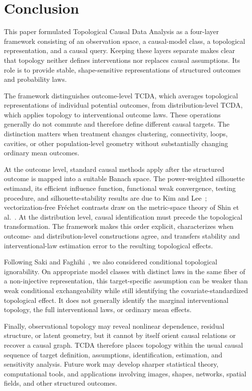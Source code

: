 \documentclass[11pt,a4paper]{article}
\theoremstyle{plain}
\theoremstyle{definition}
\theoremstyle{remark}
\newcommand{\1}{\mathbbm{1}}
\begin{document}

\section{Conclusion}
\label{sec:conclusion}

This paper formulated Topological Causal Data Analysis as a four-layer framework consisting of an observation space, a causal-model class, a topological representation, and a causal query. Keeping these layers separate makes clear that topology neither defines interventions nor replaces causal assumptions. Its role is to provide stable, shape-sensitive representations of structured outcomes and probability laws.

The framework distinguishes outcome-level TCDA, which averages topological representations of individual potential outcomes, from distribution-level TCDA, which applies topology to interventional outcome laws. These operations generally do not commute and therefore define different causal targets. The distinction matters when treatment changes clustering, connectivity, loops, cavities, or other population-level geometry without substantially changing ordinary mean outcomes.

At the outcome level, standard causal methods apply after the structured outcome is mapped into a suitable Banach space. The power-weighted silhouette estimand, its efficient influence function, functional weak convergence, testing procedure, and silhouette-stability results are due to Kim and Lee~\citep{kimlee2026}; vectorization-free Fr\'echet contrasts draw on the metric-space theory of Shin et al.~\citep{shinetal2024}. At the distribution level, causal identification must precede the topological transformation. The framework makes this order explicit, characterizes when outcome- and distribution-level constructions agree, and transfers stability and interventional-law estimation error to the resulting topological effects.

Following Saki and Faghihi~\citep{sakifaghihi2026}, we also considered conditional topological ignorability. On appropriate model classes with distinct laws in the same fiber of a non-injective representation, this target-specific assumption can be weaker than weak conditional exchangeability while still identifying the covariate-standardized topological effect. It does not generally identify the marginal interventional topology, the full interventional laws, or ordinary mean effects.

Finally, observational topology may reveal nonlinear dependence, residual structure, or latent geometry, but it cannot by itself orient causal relations or recover a causal graph. TCDA therefore places topology within the usual causal sequence of target definition, assumptions, identification, estimation, and sensitivity analysis. Future work may develop sharper statistical theory, computational tools, and applications involving images, shapes, networks, spatial fields, and other structured outcomes.



\end{document}

